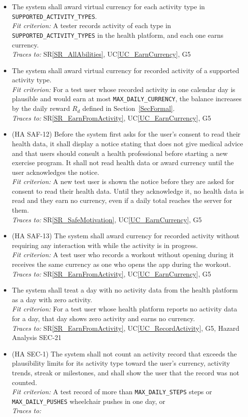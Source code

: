 \documentclass[12pt]{article}
\newcommand{\srref}[1]{SR\ref{#1}}
\newcommand{\ucref}[1]{UC\ref{#1}}
\newcounter{reqnum} %
\newcommand{\freq}[4]{%
  \item[FR\refstepcounter{reqnum}\thereqnum \label{#1}:] #2\\
  \textit{Fit criterion:} #3\\
  \textit{Traces to:} #4}
\begin{document}
\noindent \begin{itemize}
\freq{FR_ActTypes}
  {The system shall award virtual currency for each activity type in
  \texttt{SUPPORTED\_ACTIVITY\_\allowbreak TYPES}.}
  {A tester records activity of each type in
  \texttt{SUPPORTED\_ACTIVITY\_\allowbreak TYPES} in the health platform, and each one
  earns currency.}
  {\srref{SR_AllAbilities}, \ucref{UC_EarnCurrency}, G5}
\freq{FR_ActEarn}
  {The system shall award virtual currency for recorded activity of a supported
  activity type.}
  {For a test user whose recorded activity in one calendar day is plausible
  and would earn at most \texttt{MAX\_DAILY\_CURRENCY}, the balance increases
  by the daily reward $R_d$ defined in Section~\ref{SecFormal}.}
  {\srref{SR_EarnFromActivity}, \ucref{UC_EarnCurrency}, G5}
\freq{FR_ActHealthNotice}
  {(HA SAF-12) Before the system first asks for the user's consent to read their
  health data, it shall display a notice stating that \progname{} does not give
  medical advice and that users should consult a health professional before
  starting a new exercise program. It shall not read health data or award
  currency until the user acknowledges the notice.}
  {A new test user is shown the notice before they are asked for consent to read
  their health data. Until they acknowledge it, no health data is read and they
  earn no currency, even if a daily total reaches the server for them.}
  {\srref{SR_SafeMotivation}, \ucref{UC_EarnCurrency}, G5}
\freq{FR_ActNoInteraction}
  {(HA SAF-13) The system shall award currency for recorded activity without
  requiring any interaction with \progname{} while the activity is in
  progress.}
  {A test user who records a workout without opening \progname{} during it
  receives the same currency as one who opens the app during the workout.}
  {\srref{SR_EarnFromActivity}, \ucref{UC_EarnCurrency}, G5}
\freq{FR_ActNoData}
  {The system shall treat a day with no activity data from the health platform
  as a day with zero activity.}
  {For a test user whose health platform reports no activity data for a day,
  that day shows zero activity and earns no currency.}
  {\srref{SR_EarnFromActivity}, \ucref{UC_RecordActivity}, G5, Hazard Analysis
  SEC-21}
\freq{FR_ActPlausible}
  {(HA SEC-1) The system shall not count an activity record that exceeds the
  plausibility limits for its activity type toward the user's currency,
  activity trends, streak or milestones, and shall show the user that the
  record was not counted.}
  {A test record of more than \texttt{MAX\_DAILY\_STEPS} steps or
  \texttt{MAX\_DAILY\_PUSHES} wheelchair pushes in one day, or
}
\end{itemize}
\end{document}

